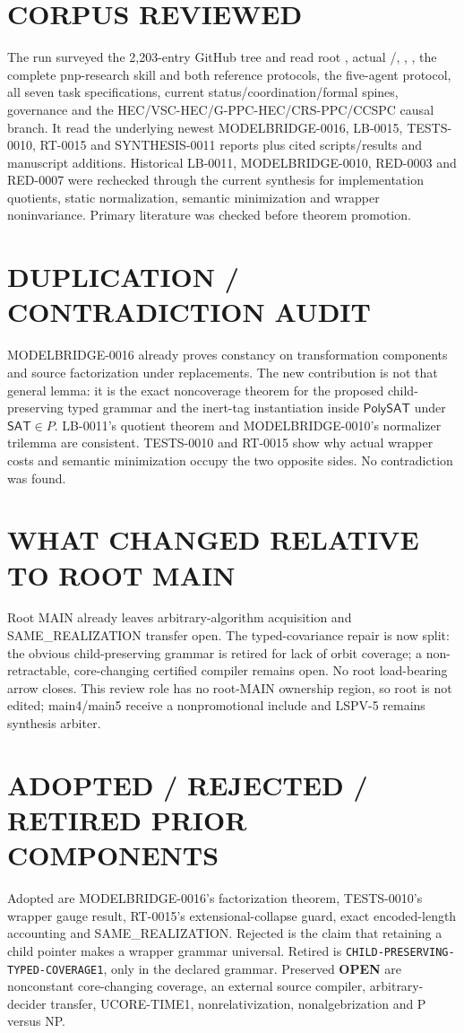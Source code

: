 \documentclass[11pt]{article}
\newcommand{\SAT}{\mathsf{SAT}}
\newcommand{\PolySAT}{\mathsf{PolySAT}}
\newcommand{\OPEN}{\textbf{OPEN}}
\begin{document}
\section{CORPUS REVIEWED}
The run surveyed the 2,203-entry GitHub tree and read root ,
actual /, , ,
the complete pnp-research skill and both reference protocols, the five-agent
protocol, all seven task specifications, current status/coordination/formal
spines, governance and the HEC/VSC-HEC/G-PPC-HEC/CRS-PPC/CCSPC causal
branch.  It read the underlying newest MODELBRIDGE-0016, LB-0015,
TESTS-0010, RT-0015 and SYNTHESIS-0011 reports plus cited scripts/results and
manuscript additions.  Historical LB-0011, MODELBRIDGE-0010, RED-0003 and
RED-0007 were rechecked through the current synthesis for implementation
quotients, static normalization, semantic minimization and wrapper
noninvariance.  Primary literature was checked before theorem promotion.

\section{DUPLICATION / CONTRADICTION AUDIT}
MODELBRIDGE-0016 already proves constancy on transformation components and
source factorization under replacements.  The new contribution is not that
general lemma: it is the exact noncoverage theorem for the proposed
child-preserving typed grammar and the inert-tag instantiation inside
\(\PolySAT\) under \(\SAT\in P\).  LB-0011's quotient theorem and
MODELBRIDGE-0010's normalizer trilemma are consistent.  TESTS-0010 and
RT-0015 show why actual wrapper costs and semantic minimization occupy the
two opposite sides.  No contradiction was found.

\section{WHAT CHANGED RELATIVE TO ROOT MAIN}
Root MAIN already leaves arbitrary-algorithm acquisition and
SAME\_REALIZATION transfer open.  The typed-covariance repair is now split:
the obvious child-preserving grammar is retired for lack of orbit coverage;
a non-retractable, core-changing certified compiler remains open.  No root
load-bearing arrow closes.  This review role has no root-MAIN ownership
region, so root  is not edited; main4/main5 receive a
nonpromotional include and LSPV-5 remains synthesis arbiter.

\section{ADOPTED / REJECTED / RETIRED PRIOR COMPONENTS}
Adopted are MODELBRIDGE-0016's factorization theorem, TESTS-0010's wrapper
gauge result, RT-0015's extensional-collapse guard, exact encoded-length
accounting and SAME\_REALIZATION.  Rejected is the claim that retaining a
child pointer makes a wrapper grammar universal.  Retired is
\texttt{CHILD-PRESERVING-TYPED-COVERAGE1}, only in the declared grammar.
Preserved \OPEN{} are nonconstant core-changing coverage, an external source
compiler, arbitrary-decider transfer, UCORE-TIME1, nonrelativization,
nonalgebrization and P versus NP.
\end{document}
